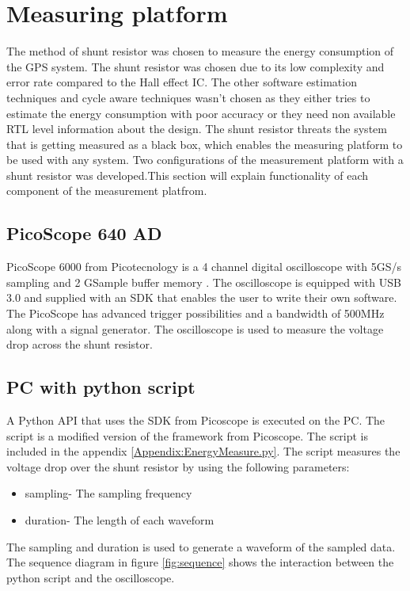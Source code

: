 \chapter{Measuring platform}

The method of shunt resistor was chosen to measure the energy consumption of the GPS system. The shunt resistor was chosen due to its low complexity and error rate compared to the Hall effect IC. The other software estimation techniques and cycle aware techniques wasn't chosen as they either tries to estimate the energy consumption with poor accuracy or they need non available RTL level information about the design. The shunt resistor threats the system that is getting measured as a black box, which enables the measuring platform to be used with any system. Two configurations of the measurement platform with a shunt resistor was developed.This section will explain functionality of each component of the measurement platfrom.


\section{PicoScope 640 AD}
PicoScope 6000 from Picotecnology is a 4 channel digital oscilloscope with 5GS/s sampling and 2 GSample buffer memory \cite{Pico}. The oscilloscope is equipped with USB 3.0 and supplied with an SDK that enables the user to write their own software. The PicoScope has advanced trigger possibilities and a bandwidth of 500MHz along with a signal generator. The oscilloscope is used to measure the voltage drop across the shunt resistor.   

\section{PC with python script}
A Python API that uses the SDK from Picoscope is executed on the PC. The script is a modified version of the framework from Picoscope. The script is included in the appendix \ref{Appendix:EnergyMeasure.py}. The script measures the voltage drop over the shunt resistor by using the following parameters:

\begin{itemize}
    \item sampling- The sampling frequency 
    \item duration- The length of each waveform
    
\end{itemize}
The sampling and duration is used to generate a waveform of the sampled data.
The sequence diagram in figure \ref{fig:sequence} shows the interaction between the python script and the oscilloscope.  

